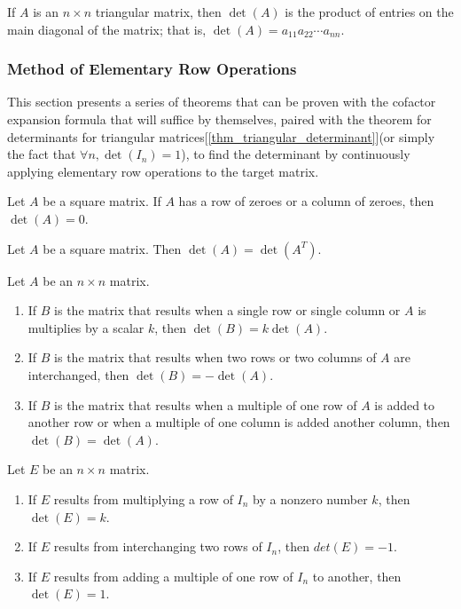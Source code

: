 \documentclass{report}
\begin{document}
				\begin{thm}\label{thm_triangular_determinant}
					If $A$ is an $n \times n$ triangular matrix, then $\det(A)$ is the product of entries on the main diagonal of the matrix; that is, $\det(A)=a_{11}a_{22}\cdots a_{nn}$.
				\end{thm}
			
			\subsubsection{Method of Elementary Row Operations}
				This section presents a series of theorems that can be proven with the cofactor expansion formula that will suffice by themselves, paired with the theorem for determinants for triangular matrices[\ref{thm_triangular_determinant}](or simply the fact that $\forall n, \det(I_n)=1$), to find the determinant by continuously applying elementary row operations to the target matrix.
				\begin{thm}
					Let $A$ be a square matrix. If $A$ has a row of zeroes or a column of zeroes, then $\det(A)=0$.
				\end{thm}
				
				\begin{thm}
					Let $A$ be a square matrix. Then $\det(A)=\det(A^T)$.
				\end{thm}
				
				\begin{thm}\label{thm_row_ops_det}
					Let $A$ be an $n \times n$ matrix.
					\begin{enumerate}
						\item If $B$ is the matrix that results when a single row or single column or $A$ is multiplies by a scalar $k$, then $\det(B)=k\det(A)$.
						\item If $B$ is the matrix that results when two rows or two columns of $A$ are interchanged, then $\det(B)=-\det(A)$.
						\item If $B$ is the matrix that results when a multiple of one row of $A$ is added to another row or when a multiple of one column is added another column, then $\det(B)=\det(A)$.
					\end{enumerate}
				\end{thm}
				
				\begin{coro}
					Let $E$ be an $n \times n$ matrix.
					\begin{enumerate}
						\item If $E$ results from multiplying a row of $I_n$ by a nonzero number $k$, then $\det(E)=k$.
						\item If $E$ results from interchanging two rows of $I_n$, then $det(E)=-1$.
						\item If $E$ results from adding a multiple of one row of $I_n$ to another, then $\det(E)=1$.
					\end{enumerate}
				\end{coro}
				
\end{document}
